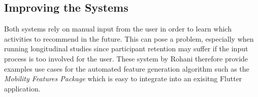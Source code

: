 \subsection{Improving the Systems}
Both systems rely on manual input from the user in order to learn which activities to recommend in the future. This can pose a problem, especially when running longitudinal studies since participant retention may suffer if the input process is too involved for the user. These system by Rohani therefore provide examples use cases for the automated feature generation algorithm such as the \textit{Mobility Features Package} which is easy to integrate into an exisitng Flutter application.